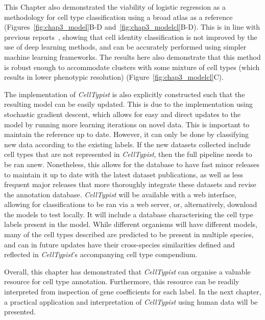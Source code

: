 This Chapter also demonstrated the viability of logistic regression as a methodology for cell type classification using a broad atlas as a reference (Figures~\ref{fig:chap3_model}B-D and~\ref{fig:chap3_modelcl}B-D). This is in line with previous reports~\citep{kohler_deep_2019,abdelaal_comparison_2019}, showing that cell identity classification is not improved by the use of deep learning methods, and can be accurately performed using simpler machine learning frameworks. The results here also demonstrate that this method is robust enough to accommodate clusters with some mixture of cell types (which results in lower phenotypic resolution) (Figure~\ref{fig:chap3_modelcl}C).

The implementation of \textit{CellTypist} is also explicitly constructed such that the resulting model can be easily updated. This is due to the implementation using stochastic gradient descent, which allows for easy and direct updates to the model by running more learning iterations on novel data. This is important to maintain the reference up to date. However, it can only be done by classifying new data according to the existing labels. If the new datasets collected include cell types that are not represented in \textit{CellTypist}, then the full pipeline needs to be ran anew. Nonetheless, this allows for the database to have fast minor releases to maintain it up to date with the latest dataset publications, as well as less frequent major releases that more thoroughly integrate these datasets and revise the annotation database. \textit{CellTypist} will be available with a web interface, allowing for classifications to be ran via a web server, or, alternatively, download the models to test locally. It will include a database characterising the cell type labels present in the model. While different organisms will have different models, many of the cell types described are predicted to be present in multiple species, and can in future updates have their cross-species similarities defined and reflected in \textit{CellTypist}'s accompanying cell type compendium.

Overall, this chapter has demonstrated that \textit{CellTypist} can organise a valuable resource for cell type annotation. Furthermore, this resource can be readily interpreted from inspection of gene coefficients for each label. In the next chapter, a practical application and interpretation of \textit{CellTypist} using human data will be presented.